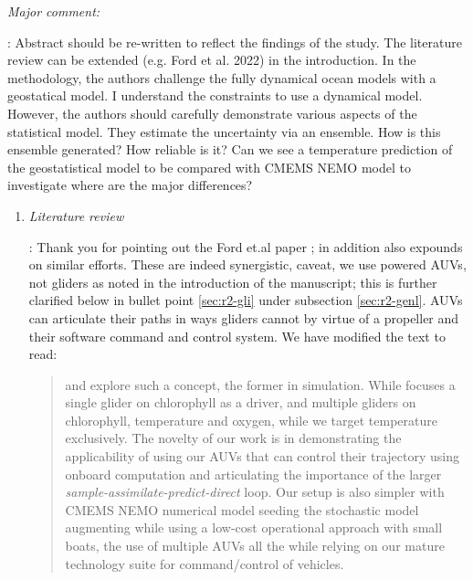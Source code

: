 \documentclass[a4paper]{article}
\begin{document}
\begin{answers}

\item {\it Major comment:}\label{sec:r1-top}

  \reply: Abstract should be re-written to reflect the findings of the
  study. The literature review can be extended (e.g. Ford et al. 2022)
  in the introduction. In the methodology, the authors challenge the
  fully dynamical ocean models with a geostatical model. I understand
  the constraints to use a dynamical model. However, the authors
  should carefully demonstrate various aspects of the statistical
  model. They estimate the uncertainty via an ensemble. How is this
  ensemble generated? How reliable is it? Can we see a temperature
  prediction of the geostatistical model to be compared with CMEMS
  NEMO model to investigate where are the major differences?

  \begin{enumerate}

  \item {\it Literature review}

    \action: Thank you for pointing out the Ford et.al paper
    \cite{ford22}; in addition \cite{wihsgott26} also expounds on
    similar efforts. These are indeed synergistic, caveat, we use
    powered AUVs, not gliders as noted in the introduction of the
    manuscript; this is further clarified below in bullet point
    \ref{sec:r2-gli} under subsection \ref{sec:r2-genl}. AUVs can
    articulate their paths in ways gliders cannot by virtue of a
    propeller and their software command and control system. We have
    modified the text to read:

  \begin{quote}

    \cite{lermusiaux07} and \cite{ford22,wihsgott26} explore such a
    concept, the former in simulation. While \cite{ford22} focuses a
    single glider on chlorophyll as a driver, and \cite{wihsgott26}
    multiple gliders on chlorophyll, temperature and oxygen, while we
    target temperature exclusively.  The novelty of our work is in
    demonstrating the applicability of using our AUVs that can control
    their trajectory using onboard computation and articulating the
    importance of the larger \emph{sample-assimilate-predict-direct}
    loop. Our setup is also simpler with CMEMS NEMO numerical model
    seeding the stochastic model augmenting while using a low-cost
    operational approach with small boats, the use of multiple AUVs
    all the while relying on our mature technology suite for
    command/control of vehicles.


\end{quote}
\end{enumerate}
\end{answers}
\end{document}
